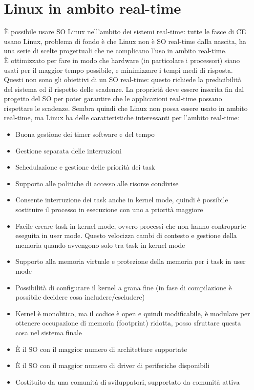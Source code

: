 \documentclass[12pt, oneside]{extbook}
\begin{document}
\section{Linux in ambito real-time}
È possibile usare SO Linux nell'ambito dei sistemi real-time: tutte le fasce di CE usano Linux, problema di fondo è che Linux non è SO real-time dalla nascita, ha una serie di scelte progettuali che ne complicano l'uso in ambito real-time.\\ È ottimizzato per fare in modo che hardware (in particolare i processori) siano usati per il maggior tempo possibile, e minimizzare i tempi medi di risposta.\\ Questi non sono gli obiettivi di un SO real-time: questo richiede la predicibilità del sistema ed il rispetto delle scadenze. La proprietà deve essere inserita fin dal progetto del SO per poter garantire che le applicazioni real-time possano rispettare le scadenze. Sembra quindi che Linux non possa essere usato in ambito real-time, ma Linux ha delle caratteristiche interessanti per l'ambito real-time:
\begin{itemize}
\item Buona gestione dei timer software e del tempo
\item Gestione separata delle interruzioni
\item Schedulazione e gestione delle priorità dei task
\item Supporto alle politiche di accesso alle risorse condivise
\item Consente interruzione dei task anche in kernel mode, quindi è possibile sostituire il processo in esecuzione con uno a priorità maggiore
\item Facile creare task in kernel mode, ovvero processi che non hanno controparte eseguita in user mode. Questo velocizza cambi di contesto e gestione della memoria quando avvengono solo tra task in kernel mode
\item Supporto alla memoria virtuale e protezione della memoria per i task in user mode
\item Possibilità di configurare il kernel a grana fine (in fase di compilazione è possibile decidere cosa includere/escludere)
\item Kernel è monolitico, ma il codice è open e quindi modificabile, è modulare per ottenere occupazione di memoria (footprint) ridotta, posso sfruttare questa cosa nel sistema finale
\item È il SO con il maggior numero di architetture supportate
\item È il SO con il maggior numero di driver di periferiche disponibili
\item Costituito da una comunità di sviluppatori, supportato da comunità attiva
\end{itemize}
\end{document}
